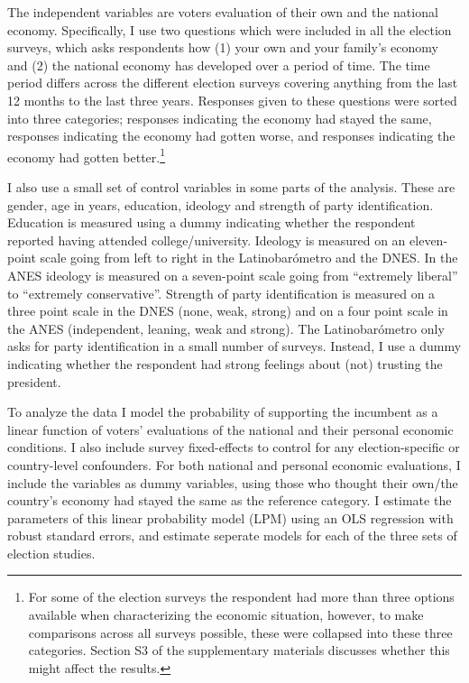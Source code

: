 \documentclass[a4paper,11pt]{article}
\begin{document}
	The independent variables are voters evaluation of their own and the national economy. Specifically, I use two questions which were included in all the election surveys, which asks respondents how (1) your own and your family's economy and (2) the national economy has developed over a period of time. The time period differs across the different election surveys covering anything from the last 12 months to the last three years. Responses given to these questions were sorted into three categories; responses indicating the economy had stayed the same, responses indicating the economy had gotten worse, and responses indicating the economy had gotten better.\footnote{For some of the election surveys the respondent had more than three options available when characterizing the economic situation, however, to make comparisons across all surveys possible, these were collapsed into these three categories. Section S3 of the supplementary materials discusses whether this might affect the results.}
	
	I also use a small set of control variables in some parts of the analysis. These are gender, age in years, education, ideology and strength of party identification. Education is measured using a dummy indicating whether the respondent reported having attended college/university.   Ideology is measured on an eleven-point scale going from left to right in the Latinobarómetro and the DNES. In the ANES ideology is measured on a seven-point scale going from ``extremely liberal'' to ``extremely conservative''. Strength of party identification is measured on a three point scale in the DNES (none, weak, strong) and on a four point scale in the ANES (independent, leaning, weak and strong). The Latinobarómetro only asks for party identification in a small number of surveys. Instead, I use a dummy indicating whether the respondent had strong feelings about (not) trusting the president.
	
	To analyze the data I model the probability of supporting the incumbent as a linear function  of voters' evaluations of the national and their personal economic conditions. I also include survey fixed-effects to control for any election-specific or country-level confounders.  For both national and personal economic evaluations, I include the variables as dummy variables, using those who thought their own/the country's economy had stayed the same as the reference category. I estimate the parameters of this linear probability model (LPM) using an OLS regression with robust standard errors, and estimate seperate models for each of the three sets of election studies.
	
\end{document}
